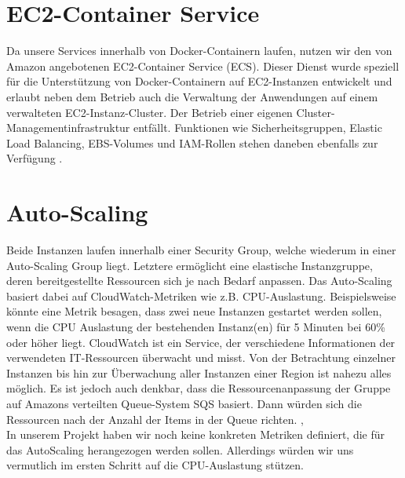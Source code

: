 \section{EC2-Container Service}
\label{sec:ecs}
Da unsere Services innerhalb von Docker-Containern laufen, nutzen wir den von Amazon angebotenen EC2-Container Service (ECS). Dieser Dienst wurde speziell für die Unterstützung von Docker-Containern auf EC2-Instanzen entwickelt und erlaubt neben dem Betrieb auch die Verwaltung der Anwendungen auf einem verwalteten EC2-Instanz-Cluster. Der Betrieb einer eigenen Cluster-Managementinfrastruktur entfällt. Funktionen wie Sicherheitsgruppen, Elastic Load Balancing, EBS-Volumes und IAM-Rollen stehen daneben ebenfalls zur Verfügung \cite{aws:ecs}.

\section{Auto-Scaling}
\label{sec:auto-scaling}
Beide Instanzen laufen innerhalb einer Security Group, welche wiederum in einer Auto-Scaling Group liegt. Letztere ermöglicht eine elastische Instanzgruppe, deren bereitgestellte Ressourcen sich je nach Bedarf anpassen. Das Auto-Scaling basiert dabei auf CloudWatch-Metriken wie z.B. CPU-Auslastung. Beispielsweise könnte eine Metrik besagen, dass zwei neue Instanzen gestartet werden sollen, wenn die CPU Auslastung der bestehenden Instanz(en) für 5 Minuten bei 60\% oder höher liegt. CloudWatch ist ein Service, der verschiedene Informationen der verwendeten IT-Ressourcen überwacht und misst. Von der Betrachtung einzelner Instanzen bis hin zur Überwachung aller Instanzen einer Region ist nahezu alles möglich. Es ist jedoch auch denkbar, dass die Ressourcenanpassung der Gruppe auf Amazons verteilten Queue-System SQS basiert. Dann würden sich die Ressourcen nach der Anzahl der Items in der Queue richten. \cite{vliet:resilience}, \cite{vliet:programmingec2} \\

In unserem Projekt haben wir noch keine konkreten Metriken definiert, die für das AutoScaling herangezogen werden sollen. Allerdings würden wir uns vermutlich im ersten Schritt auf die CPU-Auslastung stützen.

